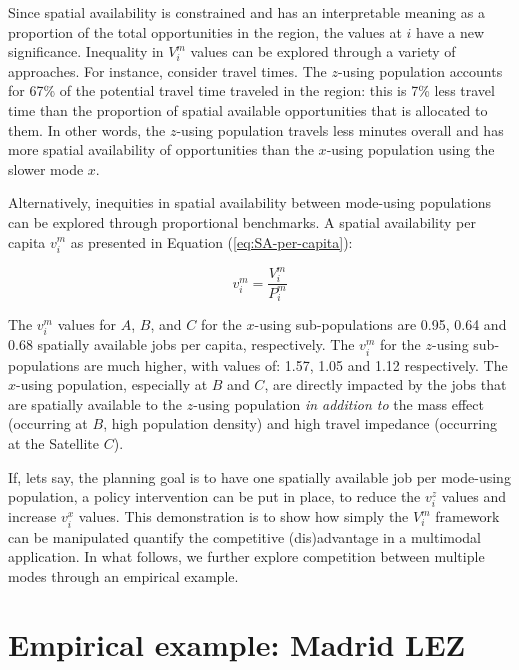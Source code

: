 \documentclass[10pt,letterpaper]{article}
\begin{document}
Since spatial availability is constrained and has an interpretable
meaning as a proportion of the total opportunities in the region, the
values at \(i\) have a new significance. Inequality in \(V_i^m\) values
can be explored through a variety of approaches. For instance, consider
travel times. The \(z\)-using population accounts for 67\% of the
potential travel time traveled in the region: this is 7\% less travel
time than the proportion of spatial available opportunities that is
allocated to them. In other words, the \(z\)-using population travels
less minutes overall and has more spatial availability of opportunities
than the \(x\)-using population using the slower mode \(x\).

Alternatively, inequities in spatial availability between mode-using
populations can be explored through proportional benchmarks. A spatial
availability per capita \(v_i^m\) as presented in Equation
(\ref{eq:SA-per-capita}):

\begin{equation}
\label{eq:SA-per-capita}
v_{i}^m = \frac{V_{i}^m}{P_{i}^m}
\end{equation}

The \(v_i^m\) values for \(A\), \(B\), and \(C\) for the \(x\)-using
sub-populations are 0.95, 0.64 and 0.68 spatially available jobs per
capita, respectively. The \(v_i^m\) for the \(z\)-using sub-populations
are much higher, with values of: 1.57, 1.05 and 1.12 respectively. The
\(x\)-using population, especially at \(B\) and \(C\), are directly
impacted by the jobs that are spatially available to the \(z\)-using
population \emph{in addition to} the mass effect (occurring at \(B\),
high population density) and high travel impedance (occurring at the
Satellite \(C\)).

If, lets say, the planning goal is to have one spatially available job
per mode-using population, a policy intervention can be put in place, to
reduce the \(v_i^z\) values and increase \(v_i^x\) values. This
demonstration is to show how simply the \(V_i^m\) framework can be
manipulated quantify the competitive (dis)advantage in a multimodal
application. In what follows, we further explore competition between
multiple modes through an empirical example.

\hypertarget{empirical-example-madrid-lez}{%
\section{Empirical example: Madrid
LEZ}\label{empirical-example-madrid-lez}}
\end{document}
